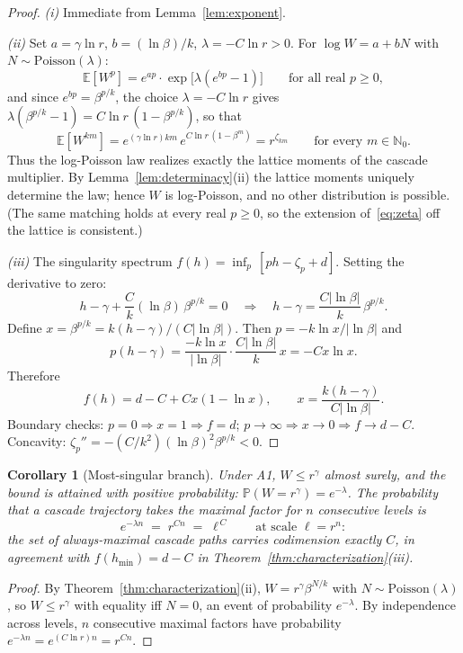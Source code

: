 \documentclass[12pt]{amsart}
\newtheorem{corollary}[theorem]{Corollary}
\theoremstyle{definition}
\theoremstyle{remark}
\begin{document}
\begin{proof}
\textit{(i)} Immediate from Lemma~\ref{lem:exponent}.

\textit{(ii)} Set $a = \gamma\ln r$, $b = (\ln\beta)/k$, $\lambda =
-C\ln r > 0$.  For $\log W = a + bN$ with $N \sim
\mathrm{Poisson}(\lambda)$:
\[
  \mathbb{E}[W^p] = e^{ap} \cdot \exp\bigl[\lambda(e^{bp} - 1)\bigr]
  \qquad\text{for all real } p \ge 0,
\]
and since $e^{bp} = \beta^{p/k}$, the choice $\lambda = -C\ln r$
gives $\lambda(\beta^{p/k}-1) = C\ln r\,(1-\beta^{p/k})$, so that
\[
  \mathbb{E}[W^{km}]
  = e^{(\gamma\ln r) km}\, e^{C\ln r\,(1-\beta^{m})}
  = r^{\zeta_{km}}
  \qquad\text{for every } m \in \mathbb{N}_0 .
\]
Thus the log-Poisson law realizes exactly the lattice moments of the
cascade multiplier.  By Lemma~\ref{lem:determinacy}(ii) the lattice
moments uniquely determine the law; hence $W$ is log-Poisson, and no
other distribution is possible.  (The same matching holds at every
real $p \ge 0$, so the extension of~\eqref{eq:zeta} off the lattice
is consistent.)

\textit{(iii)}  The singularity spectrum $f(h) = \inf_p\,[ph -
\zeta_p + d]$.  Setting the derivative to zero:
\[
  h - \gamma + \frac{C}{k}(\ln\beta)\,\beta^{p/k} = 0
  \quad\Longrightarrow\quad
  h - \gamma = \frac{C|\ln\beta|}{k}\,\beta^{p/k}.
\]
Define $x = \beta^{p/k} = k(h-\gamma)/(C|\ln\beta|)$.  Then $p =
-k\ln x / |\ln\beta|$ and
\[
  p(h - \gamma) = \frac{-k\ln x}{|\ln\beta|}
    \cdot \frac{C|\ln\beta|}{k}\,x = -Cx\ln x.
\]
Therefore
\[
  f(h) = d - C + Cx(1 - \ln x), \qquad
  x = \frac{k(h-\gamma)}{C|\ln\beta|}.
\]
Boundary checks: $p = 0 \Rightarrow x = 1 \Rightarrow f = d$; $p \to
\infty \Rightarrow x \to 0 \Rightarrow f \to d - C$.  Concavity:
$\zeta_p'' = -(C/k^2)(\ln\beta)^2\beta^{p/k} < 0$.
\end{proof}

\begin{corollary}[Most-singular branch]\label{cor:branch}
Under A1, $W \le r^\gamma$ almost surely, and the bound is attained
with positive probability: $\mathbb{P}(W = r^\gamma) = e^{-\lambda}$.
The probability that a cascade trajectory takes the maximal factor
for $n$ consecutive levels is
\[
  e^{-\lambda n} \;=\; r^{Cn} \;=\; \ell^{\,C}
  \qquad\text{at scale } \ell = r^n :
\]
the set of always-maximal cascade paths carries codimension exactly
$C$, in agreement with $f(h_{\min}) = d - C$ in
Theorem~\textup{\ref{thm:characterization}(iii)}.
\end{corollary}

\begin{proof}
By Theorem~\ref{thm:characterization}(ii), $W = r^\gamma
\beta^{N/k}$ with $N \sim \mathrm{Poisson}(\lambda)$, so $W \le
r^\gamma$ with equality iff $N = 0$, an event of probability
$e^{-\lambda}$.  By independence across levels, $n$ consecutive
maximal factors have probability $e^{-\lambda n} =
e^{(C\ln r) n} = r^{Cn}$.
\end{proof}
\end{document}
